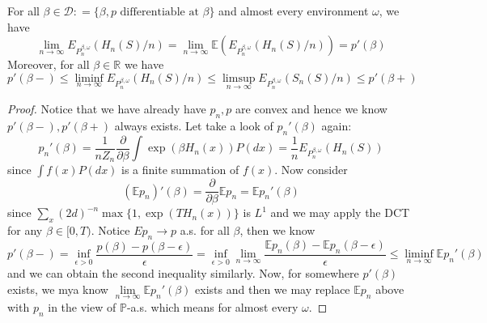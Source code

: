 \begin{proposition}
    For all $\beta \in \mathcal{D} : = \{\beta, p\text{ differentiable at }\beta\}$ and almost every environment $\omega$, we have
    \[
    \lim_{n\to\infty}E_{P^{\beta,\omega}_n}(H_n(S)/n) = \lim_{n\to\infty} \mathbb{E}(E_{P_n^{\beta,\omega}}(H_n(S)/n)) = p'(\beta)
    \]
    Moreover, for all $\beta \in \mathbb{R}$ we have
    \[
    p'(\beta - ) \leq \liminf\limits_{n\to\infty}E_{P^{\beta,\omega}_n}(H_n(S)/n) \leq \limsup\limits_{n\to\infty} E_{P^{\beta,\omega}_n} (S_n(S)/n) \leq p'(\beta +)
    \]
\end{proposition}
\begin{proof}
    Notice that we have already have $p_n,p$ are convex and hence we know $p'(\beta-),p'(\beta +)$ always exists. Let take a look of $p_n'(\beta)$ again:
    \[
    p_n'(\beta) = \dfrac{1}{nZ_n} \dfrac{\partial}{\partial \beta} \int \exp{(\beta H_n(x))} P(dx) = \dfrac{1}{n}E_{P^{\beta,\omega}_n}(H_n(S))
    \]
    since $\int f(x)P(dx)$ is a finite summation of $f(x)$. Now consider
    \[
    (\mathbb{E}p_n)'(\beta) = \dfrac{\partial}{\partial \beta} \mathbb{E} p_n = \mathbb{E} p_n'(\beta)
    \]
    since $\sum_{x}(2d)^{-n}\max\{1,\exp{(T H_n(x))}\}$ is $L^1$ and we may apply the DCT for any $\beta \in [0,T)$. Notice $Ep_n \to p$ a.s. for all $\beta$, then we know
    \[
    p'(\beta-) = \inf_{\epsilon > 0}\dfrac{p(\beta) - p(\beta-\epsilon)}{\epsilon} = \inf_{\epsilon > 0} \lim\limits_{n\to\infty} \dfrac{\mathbb{E}p_n(\beta)-\mathbb{E}p_n(\beta-\epsilon)}{\epsilon} \leq \liminf_{n\to\infty}\mathbb{E}p_n'(\beta)
    \]
    and we can obtain the second inequality similarly. Now, for somewhere $p'(\beta)$ exists, we mya know $\lim\limits_{n\to\infty} \mathbb{E}p_n'(\beta)$ exists and then we may replace $\mathbb{E}p_n$ above with $p_n$ in the view of $\mathbb{P}$-a.s. which means for almost every $\omega$.
\end{proof}

